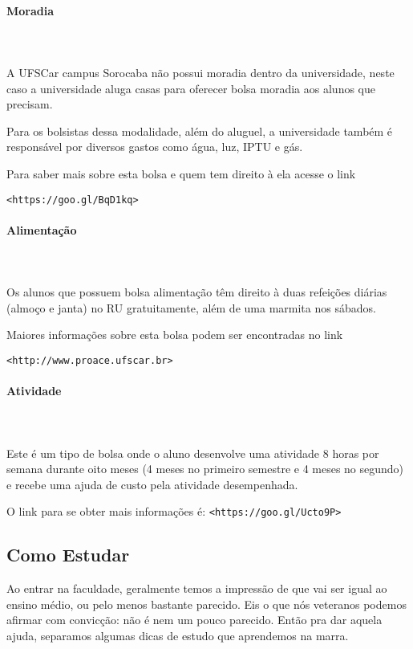 \paragraph{Moradia}\label{moradia}\mbox{} \\\\
\indent A UFSCar campus Sorocaba não possui moradia dentro da universidade, neste caso a universidade aluga casas para oferecer bolsa moradia aos alunos que precisam.

Para os bolsistas dessa modalidade, além do aluguel, a universidade também é responsável por diversos gastos como água, luz, IPTU e gás.

Para saber mais sobre esta bolsa e quem tem direito à ela acesse o link

\texttt{<https://goo.gl/BqD1kq>}

\paragraph{Alimentação}\mbox{} \\\\
\indent Os alunos que possuem bolsa alimentação têm direito à duas refeições diárias (almoço e janta) no RU gratuitamente, além de uma marmita nos sábados.

Maiores informações sobre esta bolsa podem ser encontradas no link

\texttt{<http://www.proace.ufscar.br>}


\paragraph{Atividade}\mbox{} \\\\
\indent Este é um tipo de bolsa onde o aluno desenvolve uma atividade 8 horas por semana durante oito meses (4 meses no primeiro semestre e 4 meses no segundo) e recebe uma ajuda de custo pela atividade desempenhada.


O link para se obter mais informações é:
\texttt{<https://goo.gl/Ucto9P>}

\subsection{Como Estudar}
Ao entrar na faculdade, geralmente temos a impressão de que vai ser igual ao ensino médio, ou pelo menos bastante parecido. Eis o que nós veteranos podemos afirmar com convicção: não é nem um pouco parecido. Então pra dar aquela ajuda, separamos algumas dicas de estudo que aprendemos na marra.


